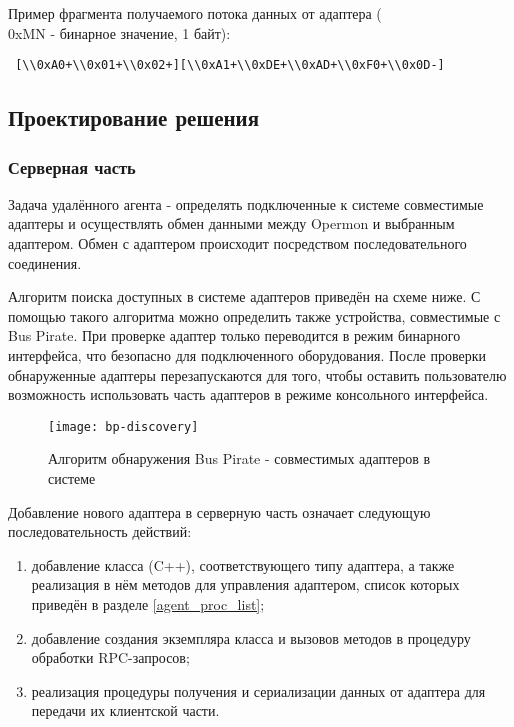 Пример фрагмента получаемого потока данных от адаптера (\\0xMN - бинарное значение, 1 байт):

\begin{verbatim}
 [\\0xA0+\\0x01+\\0x02+][\\0xA1+\\0xDE+\\0xAD+\\0xF0+\\0x0D-]
\end{verbatim}

\subsection{Проектирование решения}

\subsubsection*{Серверная часть}

Задача удалённого агента - определять подключенные к системе совместимые адаптеры и осуществлять обмен данными между Opermon и выбранным адаптером. Обмен с адаптером происходит посредством последовательного соединения.

Алгоритм поиска доступных в системе адаптеров приведён на схеме ниже. С помощью такого алгоритма можно определить также устройства, совместимые с Bus Pirate. При проверке адаптер только переводится в режим бинарного интерфейса, что безопасно для подключенного оборудования. После проверки обнаруженные адаптеры перезапускаются для того, чтобы оставить пользователю возможность использовать часть адаптеров в режиме консольного интерфейса.

\begin{figure}[H]
 \centering
 \texttt{[image: bp-discovery]}
 \caption{Алгоритм обнаружения Bus Pirate - совместимых адаптеров в системе}
 \label{fig:bp-discovery}
\end{figure}

Добавление нового адаптера в серверную часть означает следующую последовательность действий:

\begin{enumerate}
 \item добавление класса (C++), соответствующего типу адаптера, а также реализация в нём методов для управления адаптером, список которых приведён в разделе \ref{agent_proc_list};
 \item добавление создания экземпляра класса и вызовов методов в процедуру обработки RPC-запросов;
 \item реализация процедуры получения и сериализации данных от адаптера для передачи их клиентской части.
\end{enumerate}


